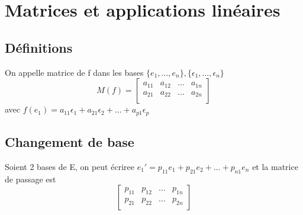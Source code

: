 \documentclass[french]{yLectureNote}
\begin{document}
\section{Matrices et applications linéaires}
\subsection{Définitions}
\begin{definition}[Matrice de f]
On appelle matrice de f dans les bases \(\{e_1,\dots,e_n\}, \{\epsilon_1,\dots, \epsilon_n\}\) \[M(f) = \begin{bmatrix}
a_{11}&a_{12}&\dots& a_{1n}\\
a_{21}&a_{22}&\dots& a_{2n}\\
\end{bmatrix}\] avec \(f(e_1) = a_{11}\epsilon_{1}+a_{21}\epsilon_{2}+\dots+a_{p1}\epsilon_p\)
\end{definition}
\subsection{Changement de base}
\begin{definition}
Soient 2 bases de E, on peut écriree \(e_1' = p_{11}e_1+p_{21}e_{2}+\dots+p_{n1}e_n\) et la matrice de passage est  \[ \begin{bmatrix}
p_{11}&p_{12}&\dots& p_{1n}\\
p_{21}&p_{22}&\dots& p_{2n}\\
\end{bmatrix}\]
\end{definition}
\end{document}
